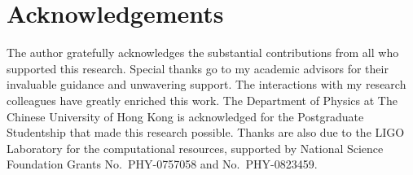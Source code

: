\documentclass[10pt,a4paper,onecolumn]{article}
\begin{document}
\section{Acknowledgements}\label{acknowledgements}

The author gratefully acknowledges the substantial contributions from
all who supported this research. Special thanks go to my academic
advisors for their invaluable guidance and unwavering support. The
interactions with my research colleagues have greatly enriched this
work. The Department of Physics at The Chinese University of Hong Kong
is acknowledged for the Postgraduate Studentship that made this research
possible. Thanks are also due to the LIGO Laboratory for the
computational resources, supported by National Science Foundation Grants
No.~PHY-0757058 and No.~PHY-0823459.
\end{document}
